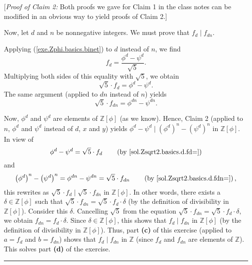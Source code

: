 \documentclass[paper=a4, fontsize=12pt]{scrartcl}%
\newcommand{\ZZ}{\mathbb{Z}}
\newcommand{\tup}[1]{\left( #1 \right)}
\newcommand{\ive}[1]{\left[ #1 \right]}
\theoremstyle{plainsl}
\theoremstyle{definition}
\theoremstyle{remark}
\begin{document}
[\textit{Proof of Claim 2:} Both proofs we gave for Claim 1 in the class notes
can be modified in an obvious way to yield proofs of Claim 2.]

Now, let $d$ and $n$ be nonnegative integers. We must prove that $f_{d}\mid
f_{dn}$.

Applying (\ref{exe.Zphi.basics.binet}) to $d$ instead of $n$, we find%
\[
f_{d}=\dfrac{\phi^{d}-\psi^{d}}{\sqrt{5}}.
\]
Multiplying both sides of this equality with $\sqrt{5}$, we obtain
\begin{equation}
\sqrt{5} \cdot f_{d} = \phi^{d}-\psi^{d}.
\label{sol.Zsqrt2.basics.d.fd=}
\end{equation}
The same argument (applied to $dn$ instead of $n$) yields
\begin{equation}
\sqrt{5} \cdot f_{dn} = \phi^{dn}-\psi^{dn} .
\label{sol.Zsqrt2.basics.d.fdn=}
\end{equation}

Now, $\phi^{d}$ and $\psi^{d}$ are elements of $\mathbb{Z}\left[  \phi\right]
$ (as we know). Hence, Claim 2 (applied to $n$, $\phi^{d}$ and $\psi^{d}$
instead of $d$, $x$ and $y$) yields $\phi^{d}-\psi^{d}\mid\left(  \phi
^{d}\right)  ^{n}-\left(  \psi^{d}\right)  ^{n}$ in $\mathbb{Z}\left[
\phi\right]  $. In view of
\[
 \phi^{d}-\psi^{d} = \sqrt{5} \cdot f_{d}
 \qquad \tup{\text{by \eqref{sol.Zsqrt2.basics.d.fd=}}}
\]
and
\[
 \left(  \phi ^{d}\right)  ^{n}-\left(  \psi^{d}\right)  ^{n}
 = \phi^{dn}-\psi^{dn} = \sqrt{5} \cdot f_{dn}
 \qquad \tup{\text{by \eqref{sol.Zsqrt2.basics.d.fdn=}}} ,
\]
this rewrites as
$\sqrt{5} \cdot f_{d} \mid \sqrt{5} \cdot f_{dn}$ in $\ZZ\ive{\phi}$.
In other words, there exists a $\delta \in \ZZ\ive{\phi}$ such that
$\sqrt{5} \cdot f_{dn} = \sqrt{5} \cdot f_{d} \cdot \delta$
(by the definition of divisibility in $\ZZ\ive{\phi}$).
Consider this $\delta$.
Cancelling $\sqrt{5}$ from the equation
$\sqrt{5} \cdot f_{dn} = \sqrt{5} \cdot f_{d} \cdot \delta$,
we obtain
$f_{dn} = f_{d} \cdot \delta$.
Since $\delta \in \ZZ\ive{\phi}$,
this shows that $f_d \mid f_{dn}$ in $\ZZ\ive{\phi}$
(by the definition of divisibility in $\ZZ\ive{\phi}$).
Thus, part \textbf{(c)} of this exercise (applied to $a = f_d$
and $b = f_{dn}$) shows that $f_d \mid f_{dn}$ in $\ZZ$ (since $f_d$
and $f_{dn}$ are elements of $\ZZ$).
This solves part \textbf{(d)} of the exercise.

\rule{\linewidth}{0.3pt} \\[0.4cm]
\end{document}
